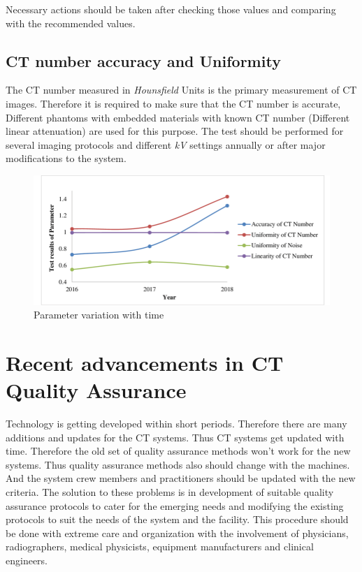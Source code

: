 \documentclass[12pt]{article}
\begin{document}
Necessary actions should be taken after checking those values and comparing with the recommended values. 

\subsection{CT number accuracy and Uniformity}
The CT number measured in \textit{Hounsfield} Units is the primary measurement of CT images. Therefore it is required to make sure that the CT number is accurate, Different phantoms with embedded materials with known CT number (Different linear attenuation) are used for this purpose. The test should be performed for several imaging protocols and different \textit{kV} settings annually or after major modifications to the system.

\begin{figure}[h!]
  \centering
  \includegraphics[width=0.75\linewidth]{CTN.png}
  \caption{\small{Parameter variation with time}}
  \label{fig:Parameter variation with time}
\end{figure}

\pagebreak
\section{Recent advancements in CT Quality Assurance}
Technology is getting developed within short periods. Therefore there are many additions and updates for the CT systems. Thus CT systems get updated with time. Therefore the old set of quality assurance methods won't work for the new systems. Thus quality assurance methods also should change with the machines. And the system crew members and practitioners should be updated with the new criteria. The solution to these problems is in development of suitable quality assurance protocols to cater for the emerging needs and modifying the existing protocols to suit the needs of the system and the facility. This procedure should be done with extreme care and organization with the involvement of physicians, radiographers, medical physicists, equipment manufacturers and clinical engineers.
\end{document}
